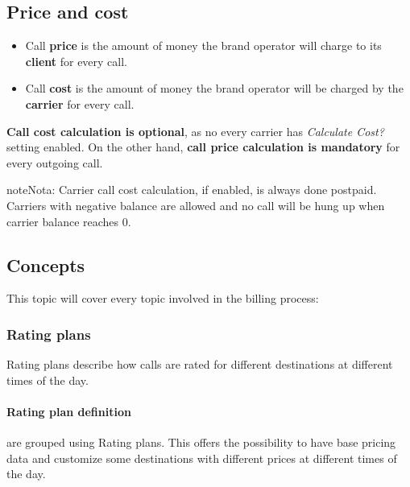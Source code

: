 \documentclass[letterpaper,10pt,spanish]{sphinxmanual}
\begin{document}
\subsection{Price and cost}
\label{administration_portal/brand/billing/index:price-and-cost}\begin{itemize}
\item {} 
Call \textbf{price} is the amount of money the brand operator will charge to its \textbf{client} for every call.

\item {} 
Call \textbf{cost} is the amount of money the brand operator will be charged by the \textbf{carrier} for every call.

\end{itemize}

\textbf{Call cost calculation is optional}, as no every carrier has \emph{Calculate Cost?} setting enabled. On the other hand, \textbf{call
price calculation is mandatory} for every outgoing call.

\begin{notice}{note}{Nota:}
Carrier call cost calculation, if enabled, is always done postpaid. Carriers with negative balance are allowed and
no call will be hung up when carrier balance reaches 0.
\end{notice}


\subsection{Concepts}
\label{administration_portal/brand/billing/index:concepts}
This topic will cover every topic involved in the billing process:


\subsubsection{Rating plans}
\label{administration_portal/brand/billing/rating_plans:rating-plans}\label{administration_portal/brand/billing/rating_plans::doc}\label{administration_portal/brand/billing/rating_plans:id1}
Rating plans describe how calls are rated for different destinations at different times of the day.


\paragraph{Rating plan definition}
\label{administration_portal/brand/billing/rating_plans:rating-plan-definition}
{\hyperref[administration_portal/brand/billing/destination_rates:destination\string-rates]{}} are grouped using Rating plans. This offers the possibility to have base pricing data and customize
some destinations with different prices at different times of the day.
\end{document}
